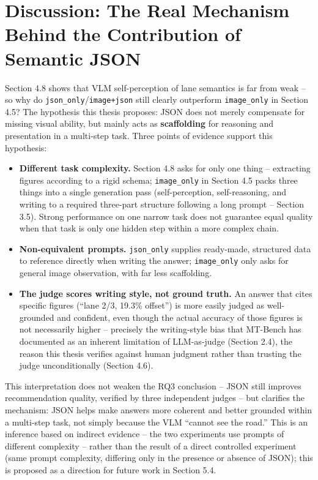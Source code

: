 \documentclass[12pt,a4paper]{report}
\begin{document}
\section{Discussion: The Real Mechanism Behind the Contribution of Semantic JSON}

Section 4.8 shows that VLM self-perception of lane semantics is far from weak -- so why do \texttt{json\_only}/\texttt{image+json} still clearly outperform \texttt{image\_only} in Section 4.5? The hypothesis this thesis proposes: JSON does not merely compensate for missing visual ability, but mainly acts as \textbf{scaffolding} for reasoning and presentation in a multi-step task. Three points of evidence support this hypothesis:

\begin{itemize}
    \item \textbf{Different task complexity.} Section 4.8 asks for only one thing -- extracting figures according to a rigid schema; \texttt{image\_only} in Section 4.5 packs three things into a single generation pass (self-perception, self-reasoning, and writing to a required three-part structure following a long prompt -- Section 3.5). Strong performance on one narrow task does not guarantee equal quality when that task is only one hidden step within a more complex chain.
    \item \textbf{Non-equivalent prompts.} \texttt{json\_only} supplies ready-made, structured data to reference directly when writing the answer; \texttt{image\_only} only asks for general image observation, with far less scaffolding.
    \item \textbf{The judge scores writing style, not ground truth.} An answer that cites specific figures (``lane 2/3, 19.3\% offset'') is more easily judged as well-grounded and confident, even though the actual accuracy of those figures is not necessarily higher -- precisely the writing-style bias that MT-Bench has documented as an inherent limitation of LLM-as-judge \cite{zheng2023mtbench} (Section 2.4), the reason this thesis verifies against human judgment rather than trusting the judge unconditionally (Section 4.6).
\end{itemize}

This interpretation does not weaken the RQ3 conclusion -- JSON still improves recommendation quality, verified by three independent judges -- but clarifies the mechanism: JSON helps make answers more coherent and better grounded within a multi-step task, not simply because the VLM ``cannot see the road.'' This is an inference based on indirect evidence -- the two experiments use prompts of different complexity -- rather than the result of a direct controlled experiment (same prompt complexity, differing only in the presence or absence of JSON); this is proposed as a direction for future work in Section 5.4.
\end{document}
